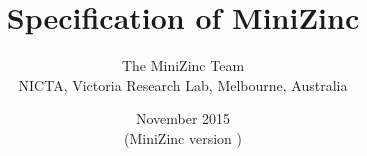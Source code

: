 \documentclass[10pt]{scrartcl}
\title{\textbf{Specification of MiniZinc}}
\author{The MiniZinc Team\\[2ex]
NICTA, Victoria Research Lab, Melbourne, Australia}
\date{November 2015\\
{\small (MiniZinc version \mznversion)}}
\begin{document}
\maketitle
\thispagestyle{empty}


\newcommand{\RuleModel}{
\production{model}
    \maybe{\semicolons{\nt{item}}}
}
\newcommand{\RuleItem}{
\production{item}
\nt{include-item}
\alt\nt{var-decl-item}
\alt\nt{assign-item}
\alt\nt{constraint-item}
\alt\nt{solve-item}
\alt\nt{output-item}
\alt\nt{predicate-item}
\alt\nt{test-item}
\alt\nt{function-item}
\alt\nt{annotation-item}
}

\newcommand{\RuleTypeInstSynItem}{
\production{type-inst-syn-item}
    \term{type} \nt{ident} \nt{annotations} \term{=} \nt{ti-expr}
}

\newcommand{\RuleEnumItem}{
\production{enum-item}
    \term{enum} \nt{ident} \nt{annotations} \maybe{\term{=} \nt{enum-cases}}
}
\newcommand{\RuleEnumCases}{
\production{enum-cases}
    \curlies{\commas{\nt{enum-case}}}
}
\newcommand{\RuleEnumCase}{
\production{enum-case}
    \nt{ident} \maybe{\parens{\commas{\nt{ti-expr-and-id}}}}
}

\newcommand{\RuleIncludeItem}{
\production{include-item}
    \term{include} \nt{string-literal}
}

\newcommand{\RuleVarDeclItem}{
\production{var-decl-item}
    \nt{ti-expr-and-id} \nt{annotations}
        \maybe{\term{=} \nt{expr}}
}

\newcommand{\RuleAssignItem}{
\production{assign-item}
    \nt{ident} \term{=} \nt{expr}
}

\newcommand{\RuleConstraintItem}{
\production{constraint-item}
    \term{constraint} \nt{expr}
}

\newcommand{\RuleSolveItem}{
\production{solve-item}
    \term{solve} \nt{annotations} \term{satisfy}
\alt\term{solve} \nt{annotations} \term{minimize} \nt{expr}
\alt\term{solve} \nt{annotations} \term{maximize} \nt{expr}
}
\end{document}
